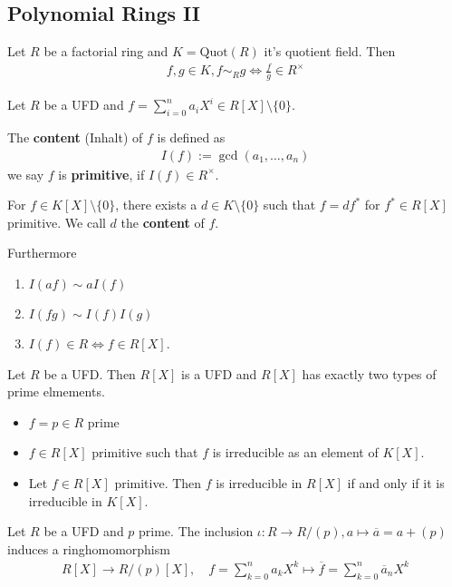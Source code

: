 
\subsection{Polynomial Rings II}

Let $R$ be a factorial ring and $K = \text{Quot}(R)$ it's quotient field.
Then
\begin{align*}
  f,g \in K, f \sim_R g \iff \frac{f}{g} \in R^{\times}
\end{align*}


\begin{dfn}[]
  Let $R$ be a UFD and $f = \sum_{i=0}^{n}a_i X^{i} \in R[X] \setminus \{0\}$.

  The \textbf{content} (Inhalt) of $f$ is defined as
  \begin{align*}
    I(f) := \gcd(a_{1}, \ldots, a_{n})
  \end{align*}
  we say $f$ is \textbf{primitive}, if $I(f) \in R^{\times}$.

\end{dfn}

\begin{lem}
  For $f \in K[X] \setminus \{0\}$, there exists a $d \in K \setminus \{0\}$ such that $f = d f^{\ast}$ for $f^{\ast} \in R[X]$ primitive.
  We call $d$ the \textbf{content} of $f$.

  Furthermore
  \begin{enumerate}
    \item $I(a f) \sim a I(f)$
    \item $I(fg) \sim I(f) I(g)$
    \item $I(f) \in R \iff f \in R [X]$.
  \end{enumerate}
\end{lem}


\begin{thm}[Gauss]
  Let $R$ be a UFD. Then $R[X]$ is a UFD and $R[X]$ has exactly two types of prime elmements.
  \begin{itemize}
    \item $f = p \in R$ prime
    \item $f \in R[X]$ primitive such that $f$ is irreducible as an element of $K[X]$.
    \item Let $f\in R[X]$ primitive. Then $f$ is irreducible in $R[X]$ if and only if it is irreducible in $K[X]$.
  \end{itemize}
\end{thm}

Let $R$ be a UFD and $p$ prime.
The inclusion $\iota: R \to R/(p), a \mapsto \overline{a}= a + (p)$
induces a ringhomomorphism
\begin{align*}
  R[X] \to R/(p)[X], \quad f = \sum_{k=0}^{n}a_kX^{k} \mapsto  \overline{f} = \sum_{k=0}^{n}\overline{a}_n X^{k}
\end{align*}

